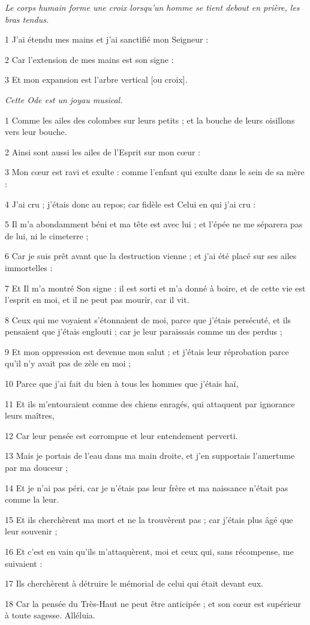 
\par \textit{Le corps humain forme une croix lorsqu'un homme se tient debout en prière, les bras tendus.}

\par 1 J'ai étendu mes mains et j'ai sanctifié mon Seigneur :
\par 2 Car l'extension de mes mains est son signe :
\par 3 Et mon expansion est l'arbre vertical [ou croix].




\par \textit{Cette Ode est un joyau musical.}

\par 1 Comme les ailes des colombes sur leurs petits ; et la bouche de leurs oisillons vers leur bouche.
\par 2 Ainsi sont aussi les ailes de l'Esprit sur mon cœur :
\par 3 Mon cœur est ravi et exulte : comme l'enfant qui exulte dans le sein de sa mère :
\par 4 J'ai cru ; j'étais donc au repos; car fidèle est Celui en qui j'ai cru :
\par 5 Il m'a abondamment béni et ma tête est avec lui ; et l'épée ne me séparera pas de lui, ni le cimeterre ;
\par 6 Car je suis prêt avant que la destruction vienne ; et j'ai été placé sur ses ailes immortelles :
\par 7 Et Il m'a montré Son signe : il est sorti et m'a donné à boire, et de cette vie est l'esprit en moi, et il ne peut pas mourir, car il vit.
\par 8 Ceux qui me voyaient s'étonnaient de moi, parce que j'étais persécuté, et ils pensaient que j'étais englouti ; car je leur paraissais comme un des perdus ;
\par 9 Et mon oppression est devenue mon salut ; et j'étais leur réprobation parce qu'il n'y avait pas de zèle en moi ;
\par 10 Parce que j'ai fait du bien à tous les hommes que j'étais haï,
\par 11 Et ils m'entouraient comme des chiens enragés, qui attaquent par ignorance leurs maîtres,
\par 12 Car leur pensée est corrompue et leur entendement perverti.
\par 13 Mais je portais de l'eau dans ma main droite, et j'en supportais l'amertume par ma douceur ;
\par 14 Et je n'ai pas péri, car je n'étais pas leur frère et ma naissance n'était pas comme la leur.
\par 15 Et ils cherchèrent ma mort et ne la trouvèrent pas ; car j'étais plus âgé que leur souvenir ;
\par 16 Et c'est en vain qu'ils m'attaquèrent, moi et ceux qui, sans récompense, me suivaient :
\par 17 Ils cherchèrent à détruire le mémorial de celui qui était devant eux.
\par 18 Car la pensée du Très-Haut ne peut être anticipée ; et son cœur est supérieur à toute sagesse. Alléluia.


